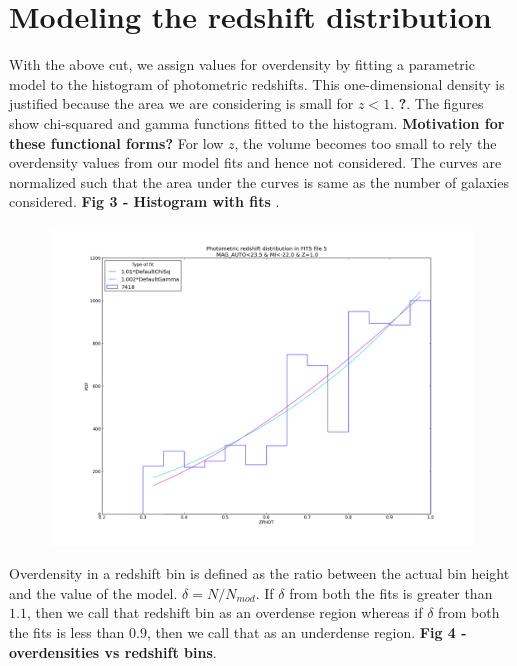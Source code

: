 \documentclass[twocolumn,useAMS,usenatbib]{mn2e}
\begin{document}
\section{Modeling the redshift distribution}
\label{S:modelling}
With the above cut, we assign values for overdensity by fitting a parametric model to the histogram of photometric redshifts. This one-dimensional density is justified because the 
area we are considering is small for $z<1$. {\bf ?}. The figures show chi-squared and gamma functions fitted to the histogram. {\bf Motivation for these functional forms?}
For low $z$, the volume becomes too small to rely the overdensity values from our model fits and hence not considered. 
The curves are normalized such that the area under the curves is same as the number of galaxies considered.
{\bf Fig 3 - Histogram with fits }. \\
\begin{figure}[H]
 \centering
  \includegraphics[width=\columnwidth]{Figures/fig3}
  \label{fig:fig3}
  \caption{}
\end{figure}

Overdensity in a redshift bin is defined as the ratio between the actual bin height and the value of the model. $\delta = N / N_{mod}$.
If $\delta$ from both the fits is greater than $1.1$, then we call that redshift bin as an
overdense region whereas if $\delta$ from both the fits is less than $0.9$, then we call that as an underdense region. {\bf Fig 4 - overdensities vs redshift bins}.
\end{document}
